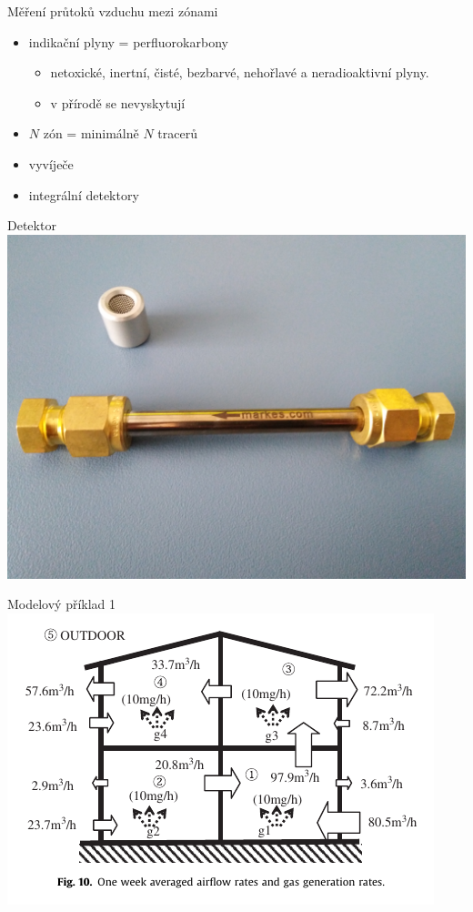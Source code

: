 \documentclass[10pt]{beamer}
\begin{document}
\begin{frame}{Měření průtoků vzduchu mezi zónami}
    \small
    \begin{itemize}
        \item indikační plyny = perfluorokarbony
            \begin{itemize}
                \item netoxické, inertní, čisté, bezbarvé, nehořlavé a neradioaktivní plyny. 
                \item v přírodě se nevyskytují
            \end{itemize}
        \item $N$ zón = minimálně $N$ tracerů
        \item vyvíječe
        \item integrální detektory 
    \end{itemize}
\end{frame}

\begin{frame}{Detektor}
    \small
        \centering
        \includegraphics[width=.6\textwidth]{meridlo_traceru.jpg}
\end{frame}

\begin{frame}{Modelový příklad 1}
        \centering
        \includegraphics[width=.9\textwidth]{zony.png}
        \cite{japonci}       
\end{frame}
\end{document}
